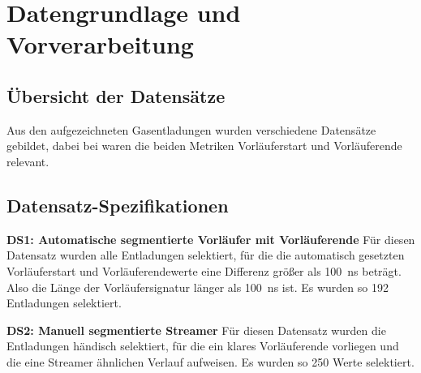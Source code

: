 \section{Datengrundlage und Vorverarbeitung}
\subsection{Übersicht der Datensätze}
Aus den aufgezeichneten Gasentladungen wurden verschiedene Datensätze gebildet, dabei bei waren die beiden Metriken Vorläuferstart und Vorläuferende relevant.

\begin{table}[h!]
\centering
\caption{Übersicht der verwendeten Datensätze}
\end{table}

\subsection{Datensatz-Spezifikationen}

\textbf{DS1: Automatische segmentierte Vorläufer mit Vorläuferende}\newline
Für diesen Datensatz wurden alle Entladungen selektiert, für die die automatisch gesetzten Vorläuferstart und Vorläuferendewerte eine Differenz größer als \SI{100}{\nano\second} beträgt. Also die Länge der Vorläufersignatur länger als \SI{100}{\nano\second} ist. Es wurden so 192 Entladungen selektiert.

\textbf{DS2: Manuell segmentierte Streamer}\newline
Für diesen Datensatz wurden die Entladungen händisch selektiert, für die ein klares Vorläuferende vorliegen und die eine Streamer ähnlichen Verlauf aufweisen. Es wurden so 250 Werte selektiert.

